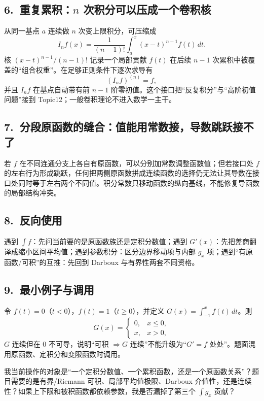 \documentclass[UTF8,a4paper,10pt]{ctexart}
\begin{document}
\begin{center}

\end{center}

\subsection*{6.\ 重复累积：$n$ 次积分可以压成一个卷积核}
从同一基点 $a$ 连续做 $n$ 次变上限积分，可压缩成
\[
I_n f(x)
=\frac1{(n-1)!}\int_a^x(x-t)^{n-1}f(t)\,dt.
\]
核 $(x-t)^{n-1}/(n-1)!$ 记录一个局部贡献 $f(t)$ 在后续 $n-1$ 次累积中被覆盖的“组合权重”。在足够正则条件下逐次求导有
\[
(I_n f)^{(n)}=f,
\]
并且 $I_n f$ 在基点自动带有前 $n-1$ 阶零初值。这个接口把“反复积分”与“高阶初值问题”接到 Topic12；一般卷积理论不进入数学一主干。

\subsection*{7.\ 分段原函数的缝合：值能用常数接，导数跳跃接不了}
若 $f$ 在不同连通分支上各自有原函数，可以分别加常数调整函数值；但若接口处 $f$ 的左右行为形成跳跃，任何把两侧原函数拼成连续函数的选择仍无法让其导数在接口处同时等于左右两个不同值。积分常数只移动函数的纵向基线，不能修复导函数的局部结构冲突。

\subsection*{8.\ 反向使用}
遇到 $\int f$：先问当前要的是原函数族还是定积分数值；遇到 $G'(x)$：先把差商翻译成缩小区间平均值；遇到参数积分：区分边界移动项与内部 $g_x$ 项；遇到“有原函数/可积”的互推：先回到 Darboux 与有界性两套不同资格。

\subsection*{9.\ 最小例子与调用}
令 $f(t)=0$（$t<0$），$f(t)=1$（$t\ge0$），并定义 $G(x)=\int_{-1}^{x}f(t)\,dt$。则
\[
G(x)=\begin{cases}0,&x\le0,\\x,&x>0,\end{cases}
\]
$G$ 连续但在 $0$ 不可导，说明“可积 $\Rightarrow G$ 连续”不能升级为“$G'=f$ 处处”。题面混用原函数、定积分和变限函数时调用。
\begin{tcolorbox}[title=检查句]
我当前操作的对象是“一个定积分数值、一个累积函数，还是一个原函数关系”？题目需要的是有界/Riemann 可积、局部平均值极限、Darboux 介值性，还是连续性？如果上下限和被积函数都依赖参数，我是否漏掉了第三个 $\int g_x$ 贡献？
\end{tcolorbox}
\end{document}
